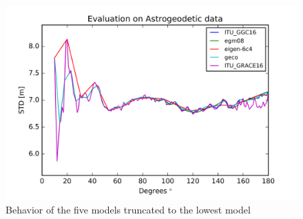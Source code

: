       
        \begin{figure}[t]
           	\caption{Behavior of the five models truncated to the lowest model}
           	\label{eigen_6c4_figure}
           	\includegraphics{Figures/grayscale_style.png}
           	\centering
        \end{figure}
        
